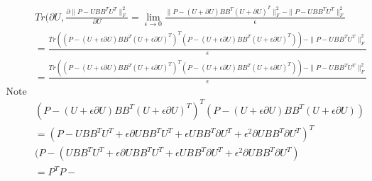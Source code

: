 \documentclass{report}
\begin{document}
 		   \begin{align*}
	 		   &Tr(\partial U, \frac{\partial \|P - UBB^TU^T\|_F^2}{\partial U} = \lim_{\epsilon \rightarrow 0} 
	 		   \frac{\|P - (U + \partial U)BB^T(U + \partial U)^T\|_F^2 
	  		   	- \|P - UBB^TU^T\|_F^2}
	 		   {\epsilon}\\
	 		   &= \frac{Tr((P - (U + \epsilon\partial U)BB^T(U + \epsilon\partial U)^T)^T
	 		   	    (P - (U + \epsilon\partial U)BB^T(U + \epsilon\partial U)^T))
	  		     	- \|P - UBB^TU^T\|_F^2}
	 		   {\epsilon}\\
	 		   &= \frac{Tr((P - (U + \epsilon\partial U)BB^T(U + \epsilon\partial U)^T)^T
	 		   	(P - (U + \epsilon\partial U)BB^T(U + \epsilon\partial U)^T))
	 		   	- \|P - UBB^TU^T\|_F^2}
	 		   {\epsilon}\\
	 		   \text{Note that}\\
		 	  &(P - (U + \epsilon\partial U)BB^T(U + \epsilon\partial U)^T)^T(P - (U + \epsilon\partial U)BB^T(U + \epsilon\partial U))\\
		 	  &=(P - UBB^TU^T + \epsilon\partial UBB^TU^T + \epsilon UBB^T\partial U^T+ \epsilon^2 \partial UBB^T\partial U^T)^T\\
		 	  &(P - (UBB^TU^T + \epsilon\partial UBB^TU^T + \epsilon UBB^T\partial U^T+ \epsilon^2 \partial UBB^T\partial U^T) \\
		 	  &=P^TP - 
     \end{align*}
	 		 

   		 
   		 
\end{document}

